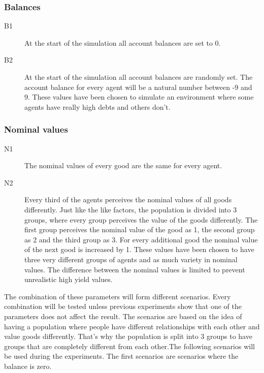 \documentclass[twoside,openright]{uva-bachelor-thesis}
\begin{document}
\subsubsection{Balances}
\begin{description}
\item[B1]	At the start of the simulation all account balances are set to 0.
\item[B2]	At the start of the simulation all account balances are randomly set. The account balance for every agent will be a natural number between -9 and 9. These values have been chosen to simulate an environment where some agents have really high debts and others don't.
\end{description}
\subsubsection{Nominal values}
\begin{description}
\item[N1]	The nominal values of every good are the same for every agent.
\item[N2]	Every third of the agents perceives the nominal values of all goods differently. Just like the like factors, the population is divided into 3 groups, where every group perceives the value of the goods differently. The first group perceives the nominal value of the good as 1, the second group as 2 and the third group as 3. For every additional good the nominal value of the next good is increased by 1. These values have been chosen to have three very different groups of agents and as much variety in nominal values. The difference between the nominal values is limited to prevent unrealistic high yield values.
\end{description} 
The combination of these parameters will form different scenarios. Every combination will be tested unless previous experiments show that one of the parameters does not affect the result. The scenarios are based on the idea of having a population where people have different relationships with each other and value goods differently. That’s why the population is split into 3 groups to have groups that are completely different from each other.The following scenarios will be used during the experiments.
The first scenarios are scenarios where the balance is zero.
\end{document}
